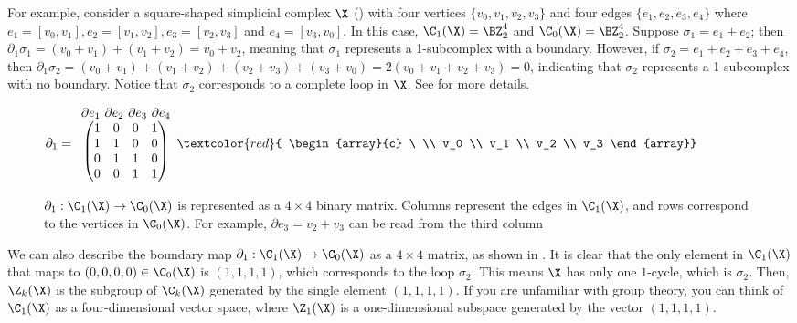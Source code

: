 For example, consider a square-shaped simplicial complex $\X$ () with four vertices $\{v_0,v_1,v_2,v_3\}$ and four edges $\{e_1,e_2,e_3,e_4\}$  where $e_1=[v_0,v_1],e_2=[v_1,v_2],e_3=[v_2,v_3]$ and $e_4=[v_3,v_0]$. In this case, $\C_1(\X)=\BZ_2^4$ and $\C_0(\X)=\BZ_2^4$. Suppose $\sigma_1=e_1+e_2$; then $\partial_1\sigma_1= (v_0+v_1)+(v_1+v_2)=v_0+v_2$, meaning that $\sigma_1$ represents a 1-subcomplex with a boundary. However, if $\sigma_2=e_1+e_2+e_3+e_4$, then $\partial_1\sigma_2= (v_0+v_1)+(v_1+v_2)+(v_2+v_3)+(v_3+v_0)=2(v_0+v_1+v_2+v_3)=0$, indicating that $\sigma_2$ represents a 1-subcomplex with no boundary. Notice that $\sigma_2$ corresponds to a complete loop in $\X$. See  for more details.

\begin{figure}
\vspace{-.15in}
\footnotesize
$\partial_1 = 
\begin{array}{c}
\partial e_1 \ \partial e_2 \ \partial e_3 \ \partial e_4  \\
\begin{pmatrix}
1 & 0 & 0 & 1 \\ %
1 & 1 & 0 & 0 \\ %
0 & 1 & 1 & 0 \\ %
0 & 0 & 1 & 1 %
\end{pmatrix}
\end{array}
\textcolor{red}{
\begin{array}{c}
\ \\
v_0 \\
v_1 \\
v_2 \\
v_3
\end{array}}$
\caption{\footnotesize $\partial_1:\C_1(\X)\to\C_0(\X)$ is represented as a $4\times 4$ binary matrix. Columns represent the edges in $\C_1(\X)$, and rows correspond to the vertices in $\C_0(\X)$. For example,  $\partial e_3= v_2+v_3$ can be read from the third column \label{fig:matrix1}}
\vspace{-.2in}
\end{figure}


We can also describe the boundary map $\partial_1: \C_1(\X) \to \C_0(\X)$ as a $4 \times 4$ matrix, as shown in . It is clear that the only element in $\C_1(\X)$ that maps to $(0,0,0,0) \in \C_0(\X)$ is $(1,1,1,1)$, which corresponds to the loop $\sigma_2$. This means $\X$ has only one $1$-cycle, which is $\sigma_2$. Then, $\Z_k(\X)$ is the subgroup of $\C_k(\X)$ generated by the single element $(1,1,1,1)$. If you are unfamiliar with group theory, you can think of $\C_1(\X)$ as a four-dimensional vector space, where $\Z_1(\X)$ is a one-dimensional subspace generated by the vector $(1,1,1,1)$.


